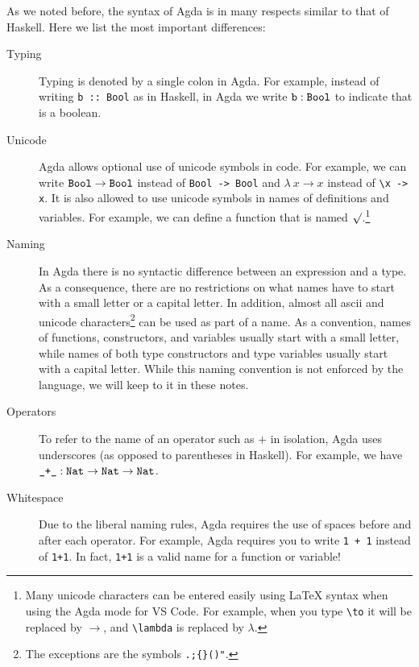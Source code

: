 \documentclass[a4paper,UKenglish]{tufte-handout}
\theoremstyle{definition}
\newcommand\fun[1]{{\AgdaFunction{#1}}}
\newcommand\data[1]{{\AgdaFunction{#1}}}
\newcommand\Nat{\data{Nat}}
\newcommand\Bool{\data{Bool}}
\begin{document}
As we noted before, the syntax of Agda is in many respects similar to
that of Haskell. Here we list the most important differences:

\begin{description}

\item[Typing] Typing is denoted by a single colon in Agda. For example, instead
of writing \texttt{b ::~Bool} as in Haskell, in Agda we write $\fun{b} : \Bool$
to indicate that \fun{b} is a boolean.

\item[Unicode] Agda allows optional use of unicode symbols in
code. For example, we can write $\Bool \to \Bool$ instead of
\texttt{Bool -> Bool} and $\lambda\ x \to x$ instead of
\texttt{\textbackslash x -> x}. It is also allowed to use unicode
symbols in names of definitions and variables. For example, we can
define a function that is named $\surd$.\footnote[][-2cm]{Many unicode
characters can be entered easily using LaTeX syntax when using the
Agda mode for VS Code. For example, when you type
\texttt{\textbackslash{}to} it will be replaced by $\to$, and
\texttt{\textbackslash{}lambda} is replaced by $\lambda$.}

\item[Naming] In Agda there is no syntactic difference between an expression
and a type. As a consequence, there are no restrictions on what names have
to start with a small letter or a capital letter. In addition, almost
all ascii and unicode characters\footnote{The exceptions are the
symbols \texttt{.;\{\}()\@"}.} can be used as part of a name. As a
convention, names of functions, constructors, and variables usually
start with a small letter, while names of both type constructors and
type variables usually start with a capital letter. While this naming
convention is not enforced by the language, we will keep to it in
these notes.

\item[Operators] To refer to the name of an operator such as $+$ in isolation,
Agda uses underscores (as opposed to parentheses in Haskell). For example, we
have $\fun{\_+\_} : \Nat \to \Nat \to \Nat$.

\item[Whitespace] Due to the liberal naming rules, Agda requires the use of
spaces before and after each operator. For example, Agda requires you to write
\texttt{1\ +\ 1} instead of \texttt{1+1}. In fact, \texttt{1+1} is a valid name
for a function or variable!


\end{description}
\end{document}
